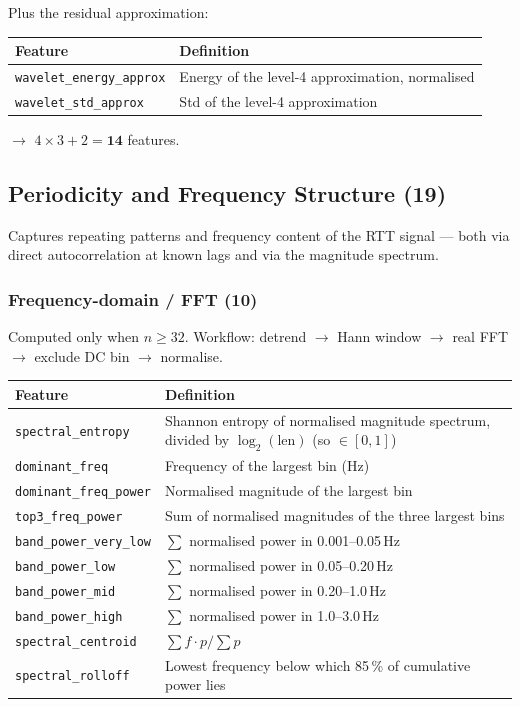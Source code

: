 \documentclass[11pt,a4paper]{article}
\begin{document}
Plus the residual approximation:

\begin{tabular}{@{}lp{10cm}@{}}
\toprule
\textbf{Feature} & \textbf{Definition} \\
\midrule
\texttt{wavelet\_energy\_approx} & Energy of the level-4 approximation, normalised \\
\texttt{wavelet\_std\_approx}    & Std of the level-4 approximation \\
\bottomrule
\end{tabular}

$\rightarrow$ $4 \times 3 + 2 = \mathbf{14}$ features.

\subsection{Periodicity and Frequency Structure (19)}

Captures repeating patterns and frequency content of the RTT signal --- both
via direct autocorrelation at known lags and via the magnitude spectrum.

\subsubsection*{Frequency-domain / FFT (10)}

Computed only when $n \ge 32$. Workflow: detrend $\rightarrow$ Hann window
$\rightarrow$ real FFT $\rightarrow$ exclude DC bin $\rightarrow$ normalise.

\begin{tabular}{@{}lp{10cm}@{}}
\toprule
\textbf{Feature} & \textbf{Definition} \\
\midrule
\texttt{spectral\_entropy}     & Shannon entropy of normalised magnitude spectrum, divided by $\log_2(\text{len})$ (so $\in [0, 1]$) \\
\texttt{dominant\_freq}        & Frequency of the largest bin (Hz) \\
\texttt{dominant\_freq\_power} & Normalised magnitude of the largest bin \\
\texttt{top3\_freq\_power}     & Sum of normalised magnitudes of the three largest bins \\
\texttt{band\_power\_very\_low}& $\sum$ normalised power in 0.001--0.05\,Hz \\
\texttt{band\_power\_low}      & $\sum$ normalised power in 0.05--0.20\,Hz \\
\texttt{band\_power\_mid}      & $\sum$ normalised power in 0.20--1.0\,Hz \\
\texttt{band\_power\_high}     & $\sum$ normalised power in 1.0--3.0\,Hz \\
\texttt{spectral\_centroid}    & $\sum f \cdot p / \sum p$ \\
\texttt{spectral\_rolloff}     & Lowest frequency below which 85\,\% of cumulative power lies \\
\bottomrule
\end{tabular}
\end{document}
